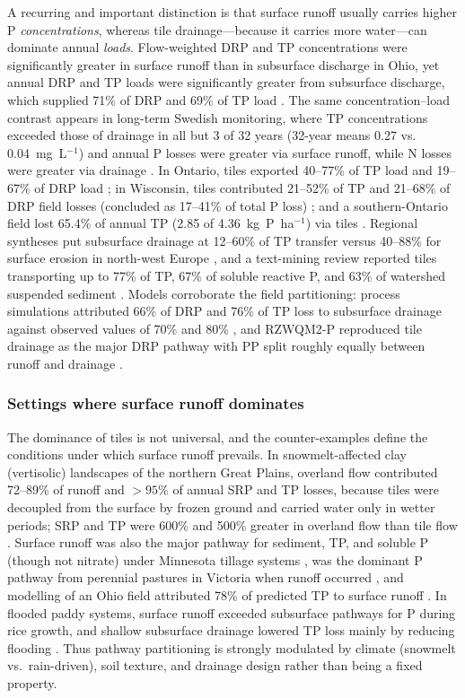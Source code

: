 A recurring and important distinction is that surface runoff usually carries higher
P \emph{concentrations}, whereas tile drainage---because it carries more
water---can dominate annual \emph{loads}. Flow-weighted DRP and TP concentrations
were significantly greater in surface runoff than in subsurface discharge in Ohio,
yet annual DRP and TP loads were significantly greater from subsurface discharge,
which supplied 71\% of DRP and 69\% of TP load \parencite{Pease2018}. The same
concentration--load contrast appears in long-term Swedish monitoring, where TP
concentrations exceeded those of drainage in all but 3 of 32 years (32-year means
0.27 vs. 0.04~mg~L$^{-1}$) and annual P losses were greater via surface runoff,
while N losses were greater via drainage \parencite{Norberg2022}. In Ontario, tiles
exported 40--77\% of TP load and 19--67\% of DRP load
\parencite{VanEsbroeck2016}; in Wisconsin, tiles contributed 21--52\% of TP and
21--68\% of DRP field losses (concluded as 17--41\% of total P loss)
\parencite{Madison2014}; and a southern-Ontario field lost 65.4\% of annual TP
(2.85 of 4.36~kg~P~ha$^{-1}$) via tiles \parencite{Qi2018}. Regional syntheses put
subsurface drainage at 12--60\% of TP transfer versus 40--88\% for surface erosion
in north-west Europe \parencite{Ulén2007}, and a text-mining review reported tiles
transporting up to 77\% of TP, 67\% of soluble reactive P, and 63\% of watershed
suspended sediment \parencite{Elsayed2023}. Models corroborate the field
partitioning: process simulations attributed 66\% of DRP and 76\% of TP loss to
subsurface drainage against observed values of 70\% and 80\% \parencite{Grewal2025},
and RZWQM2-P reproduced tile drainage as the major DRP pathway with PP split roughly
equally between runoff and drainage \parencite{Sadhukhan2019b,Sadhukhan2019}.

\subsubsection{Settings where surface runoff dominates}

The dominance of tiles is not universal, and the counter-examples define the
conditions under which surface runoff prevails. In snowmelt-affected clay
(vertisolic) landscapes of the northern Great Plains, overland flow contributed
72--89\% of runoff and $>95\%$ of annual SRP and TP losses, because tiles were
decoupled from the surface by frozen ground and carried water only in wetter
periods; SRP and TP were 600\% and 500\% greater in overland flow than tile flow
\parencite{Kokulan2019b,Kokulan2021}. Surface runoff was also the major pathway for
sediment, TP, and soluble P (though not nitrate) under Minnesota tillage systems
\parencite{Zhao2001}, was the dominant P pathway from perennial pastures in Victoria
when runoff occurred \parencite{Melland2008}, and modelling of an Ohio field
attributed 78\% of predicted TP to surface runoff \parencite{Askar2021b}. In flooded
paddy systems, surface runoff exceeded subsurface pathways for P during rice growth,
and shallow subsurface drainage lowered TP loss mainly by reducing flooding
\parencite{DarziNaftchali2016}. Thus pathway partitioning is strongly modulated by
climate (snowmelt vs.\ rain-driven), soil texture, and drainage design rather than
being a fixed property.

